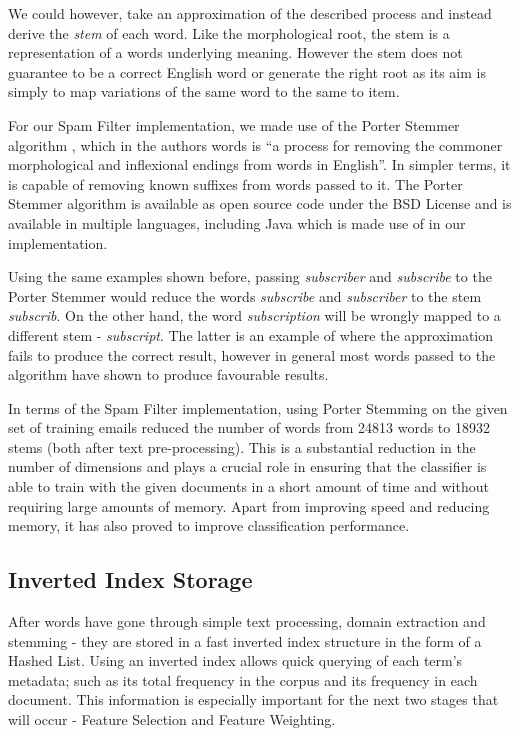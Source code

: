 We could however, take an approximation of the described process and instead derive the {\it stem} of each word. Like the morphological root, the stem is a representation of a words underlying meaning. However the stem does not guarantee to be a correct English word or generate the right root as its aim is simply to map variations of the same word to the same to item. 

For our Spam Filter implementation, we made use of the Porter Stemmer algorithm \cite{porter1980}, which in the authors words is ``a process for removing the commoner morphological and inflexional endings from words in English''. In simpler terms, it is capable of removing known suffixes from words passed to it. The Porter Stemmer algorithm is available as open source code under the BSD License and is available in multiple languages, including Java which is made use of in our implementation.

Using the same examples shown before, passing {\it subscriber} and {\it subscribe} to the Porter Stemmer would reduce the words {\it subscribe} and {\it subscriber} to the stem {\it subscrib}. On the other hand, the word {\it subscription} will be wrongly mapped to a different stem - {\it subscript}. The latter is an example of where the approximation fails to produce the correct result, however in general most words passed to the algorithm have shown to produce favourable results.

In terms of the Spam Filter implementation, using Porter Stemming on the given set of training emails reduced the number of words from 24813 words to 18932 stems (both after text pre-processing). This is a substantial reduction in the number of dimensions and plays a crucial role in ensuring that the classifier is able to train with the given documents in a short amount of time and without requiring large amounts of memory. Apart from improving speed and reducing memory, it has also proved to improve classification performance.

\subsection{Inverted Index Storage}

After words have gone through simple text processing, domain extraction and stemming - they are stored in a fast inverted index structure in the form of a Hashed List. Using an inverted index allows quick querying of each term's metadata; such as its total frequency in the corpus and its frequency in each document. This information is especially important for the next two stages that will occur - Feature Selection and Feature Weighting.

